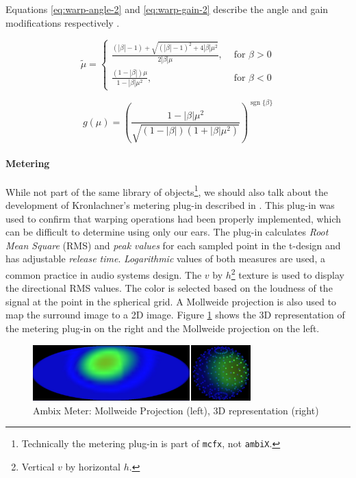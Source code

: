 Equations \ref{eq:warp-angle-2} and \ref{eq:warp-gain-2} describe the angle and gain modifications respectively \cite{kronlachner2014spatial}. 

\begin{equation}
\tilde{\mu}=\left\{\begin{array}{ll}
\frac{(|\beta|-1)+\sqrt{(|\beta|-1)^{2}+4|\beta| \mu^{2}}}{2|\beta| \mu}, & \text { for } \beta>0 \\
\frac{(1-|\beta|) \mu}{1-|\beta| \mu^{2}}, & \text { for } \beta<0
\end{array}\right.
\label{eq:warp-angle-2}
\end{equation}

\begin{equation}
g(\mu)=\left(\frac{1-|\beta| \mu^{2}}{\sqrt{(1-|\beta|)\left(1+|\beta| \mu^{2}\right)}}\right)^{\operatorname{sgn}\{\beta\}}
\label{eq:warp-gain-2}
\end{equation}

\paragraph{Metering}

While not part of the same library of objects\footnote{Technically the metering plug-in is part of \texttt{mcfx}, not \texttt{ambiX}.}, we should also talk about the development of Kronlachner's metering plug-in described in \cite{kronlachner2014spatial}. This plug-in was used to confirm that warping operations had been properly implemented, which can be difficult to determine using only our ears. The plug-in calculates \textit{Root Mean Square} (RMS) and \textit{peak values} for each sampled point in the t-design and has adjustable \textit{release time}. \textit{Logarithmic} values of both measures are used, a common practice in audio systems design. The $v$ by $h$\footnote{Vertical $v$ by horizontal $h$.} texture is used to display the directional RMS values. The color is selected based on the loudness of the signal at the point in the spherical grid. A Mollweide projection is also used to map the surround image to a 2D image. Figure \ref{fig:ambix-meter} shows the 3D representation of the metering plug-in on the right and the Mollweide projection on the left.

\begin{figure}[ht!]%
\centering
\includegraphics[width=0.75\textwidth]{img/ambix-meter.png} 
\caption{Ambix Meter: Mollweide Projection (left), 3D representation (right) \cite{kronlachner2014spatial}}
\label{fig:ambix-meter}
\end{figure}

